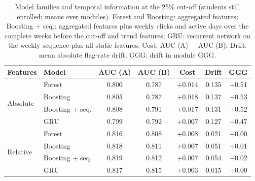 \begin{table}[t]
\centering
\caption{Model families and temporal information at the 25\% cut-off (students still enrolled; means over modules). Forest and Boosting: aggregated features; Boosting + seq.: aggregated features plus weekly clicks and active days over the complete weeks before the cut-off and trend features; GRU: recurrent network on the weekly sequence plus all static features. Cost: AUC (A) $-$ AUC (B); Drift: mean absolute flag-rate drift; GGG: drift in module GGG.}
\label{tab:sequence}
\footnotesize
\setlength{\tabcolsep}{3pt}
\begin{tabular}{@{}llccccc@{}}
\toprule
Features & Model & AUC (A) & AUC (B) & Cost & Drift & GGG \\
\midrule
\multirow{4}{*}{Absolute} & Forest & 0.800 & 0.787 & +0.014 & 0.135 & +0.51 \\
 & Boosting & 0.805 & 0.787 & +0.018 & 0.137 & +0.53 \\
 & Boosting + seq. & 0.808 & 0.791 & +0.017 & 0.131 & +0.52 \\
 & GRU & 0.799 & 0.792 & +0.007 & 0.127 & +0.47 \\
\midrule
\multirow{4}{*}{Relative} & Forest & 0.816 & 0.808 & +0.008 & 0.021 & +0.00 \\
 & Boosting & 0.818 & 0.811 & +0.007 & 0.051 & +0.01 \\
 & Boosting + seq. & 0.819 & 0.812 & +0.007 & 0.054 & +0.02 \\
 & GRU & 0.817 & 0.815 & +0.003 & 0.015 & +0.00 \\
\bottomrule
\end{tabular}
\end{table}

